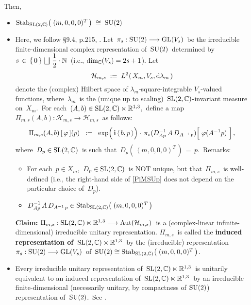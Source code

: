 \vskip 0.5cm
\noindent
Then,
\begin{itemize}
\item
	$\textnormal{Stab}_{\textnormal{SL}(2,\mathbb{C})}\!\left(\;(m,0,0,0)^{T}\,\right) \;\cong\; \textnormal{SU}(2)$
\item
	Here, we follow \S9.4, p.215, \cite{Talagrand2022}.
	Let
	\,$\pi_{s} : \textnormal{SU}(2) \longrightarrow \textnormal{GL}(V_{s})$\,
	be the irreducible finite-dimensional complex representation of \,$\textnormal{SU}(2)$\,
	determined by
	\,$s \,\in\, \{\,0\,\} \,\bigsqcup\, \dfrac{1}{2}\cdot\mathbb{N}$\,
	(i.e., $\dim_{\mathbb{C}}(V_{s}) = 2s + 1$).
	Let
	\begin{equation*}
	\mathcal{H}_{m,s}
	\; := \;
		L^{2}\!\left(\,X_{m},V_{s},\textnormal{d}\lambda_{m}\,\right)
	\end{equation*}
	denote the (complex) Hilbert space of $\lambda_{m}$-square-integrable
	$V_{s}$-valued functions, where
	\,$\lambda_{m}$\, is the (unique up to scaling)
	\,$\textnormal{SL}(2,\mathbb{C})$-invariant measure on
	\,$X_{m}$.\,
	For each
	\,$(A,b) \in \textnormal{SL}(2,\mathbb{C}) \ltimes \mathbb{R}^{1,3}$,\,
	define a map
	\,$\Pi_{m,s}\!\left(A,b\right) : \mathcal{H}_{m,s} \longrightarrow \mathcal{H}_{m,s}$\,
	as follows:
	\begin{equation}\label{PiMSUp}
	\Pi_{m,s}\!\left(A,b\right)[\,\varphi\,](p)
	\;\; := \;\;
		\exp\!\left(\,\overset{{\color{white}.}}{\i}\,\langle\,b,p\,\rangle\right)
		\cdot\,
		\pi_{s}(D^{-1}_{Ap}\,A\,D_{A^{-1}\,p})\!\left[\;
			\overset{{\color{white}.}}{\varphi(A^{-1}p)}
			\;\right],
	\end{equation}
	where
	\,$D_{p} \in \textnormal{SL}(2,\mathbb{C})$\, is such that \,$D_{p}\!\left(\,(m,0,0,0)^{T}\,\right) \,=\, p$.\,
	\vskip 0.1cm
	\noindent
	Remarks:
	\begin{itemize}
	\item
		For each \,$p \in X_{m}$,\, $D_{p} \in \textnormal{SL}(2,\mathbb{C})$\, is NOT unique,
		but that \,$\Pi_{m,s}$\, is well-defined
		(i.e., the right-hand side of \eqref{PiMSUp} does not depend on the particular choice of \,$D_{p}$).\,
	\item
		$D^{-1}_{Ap}\,A\,D_{A^{-1}\,p} \in \textnormal{Stab}_{\textnormal{SL}(2,\mathbb{C})}\!\left(\;(m,0,0,0)^{T}\,\right)$
	\end{itemize}
	\vskip 0.1cm
	\textbf{Claim:}\;
	$\Pi_{m,s} : \textnormal{SL}(2,\mathbb{C}) \ltimes \mathbb{R}^{1,3} \longrightarrow \textnormal{Aut}\!\left(\mathcal{H}_{m,s}\right)$\,
	is a (complex-linear infinite-dimensional) irreducible unitary representation.
	\vskip 0.1cm
	$\Pi_{m,s}$\, is called the \textbf{induced representation of \,$\textnormal{SL}(2,\mathbb{C}) \times \mathbb{R}^{1,3}$}\,
	by the (irreducible) representation
	\,$\pi_{s} : \textnormal{SU}(2) \longrightarrow \textnormal{GL}(V_{s})$\,
	of
	\,$\textnormal{SU}(2) \cong \textnormal{Stab}_{\textnormal{SL}(2,\mathbb{C})}\!\left(\;(m,0,0,0)^{T}\,\right)$.\,
\item
	Every irreducible unitary representation of
	\,$\textnormal{SL}(2,\mathbb{C}) \ltimes \mathbb{R}^{1,3}$\,
	is unitarily equivalent to an induced representation of
	\,$\textnormal{SL}(2,\mathbb{C}) \ltimes \mathbb{R}^{1,3}$\,
	by an irreducible finite-dimensional (necessarily unitary, by compactness of $\textnormal{SU}(2)$)
	representation of \,$\textnormal{SU}(2)$.\,
	See \cite{Wigner1939}.
\end{itemize}

